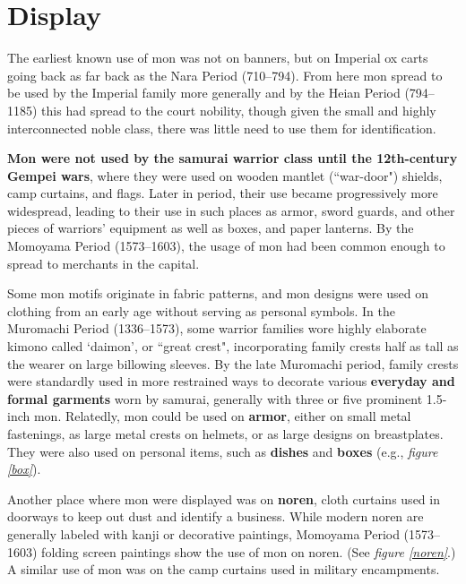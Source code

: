 \documentclass{article}
\newcounter{fig}
\def\NaraPeriod{Nara Period (710--794)}
\def\HeianPeriod{Heian Period (794--1185)}
\def\MuromachiPeriod{Muromachi Period (1336--1573)}
\def\MomoyamaPeriod{Momoyama Period (1573--1603)}
\begin{document}
\section{Display}

  The earliest known use of mon was not on banners, but on Imperial ox
  carts going back as far back as the \NaraPeriod.
  From here mon spread to be used by the Imperial family more generally
  and by the \HeianPeriod{} this had spread to the court nobility, 
  though given the small and
  highly interconnected noble class, there was little need to use them
  for identification.

  \textbf{Mon were not used by the samurai warrior class until the
  12th-century Gempei wars}, where they were used on wooden mantlet
  (``war-door") shields, camp curtains, and flags.
   Later in period, their use became progressively more
  widespread, leading to their use in such places as armor, sword guards,
  and other pieces of
  warriors' equipment as well as boxes, and paper lanterns.
  By the \MomoyamaPeriod, the usage of mon had been common enough to
  spread to merchants in the capital.

  Some mon motifs
  originate in fabric patterns, and mon designs were used on
  clothing from an early age without serving as personal symbols.  In the \MuromachiPeriod, some warrior
  families wore highly elaborate kimono called `daimon', or
  ``great crest", incorporating family crests half as tall as the
  wearer on large billowing sleeves. By the late
  Muromachi period, family crests were standardly used in more
  restrained ways to decorate various \textbf{everyday and formal garments}
  worn by samurai, generally with three or five prominent 1.5-inch
  mon.  Relatedly, mon could be used on \textbf{armor},
  either on small metal fastenings, as large metal crests on helmets,
  or as large designs on breastplates. They were also used on personal items,
  such as \textbf{dishes} and \textbf{boxes} (e.g., \emph{figure \ref{box}}).

  Another place where mon were displayed was on \textbf{noren}, cloth curtains used 
  in doorways to keep out dust and identify a business.  While modern 
  noren are generally labeled with kanji or decorative paintings, 
  \MomoyamaPeriod{} folding screen paintings show the use of 
  mon on noren. (See \emph{figure \ref{noren}}.)
  A similar use of mon was on
  the camp curtains used in military encampments.
\end{document}
